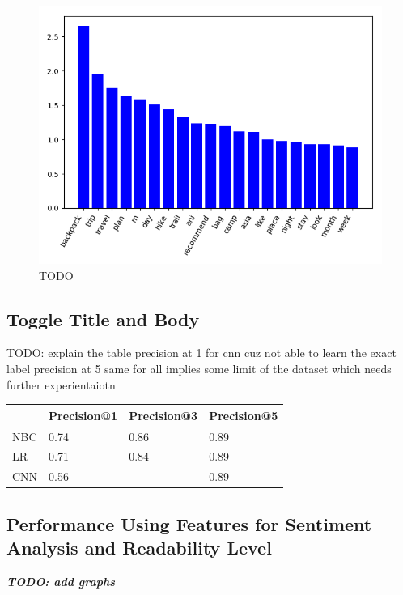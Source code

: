 \documentclass{sig-alternate-05-2015}
\begin{document}
\begin{figure}[H]
\centering
\includegraphics[width=\linewidth]{../coefficients-backpacking-dim-78.png}
\caption{TODO}
\end{figure}

\subsection{Toggle Title and Body}

TODO: explain the table
precision at 1 for cnn cuz not able to learn the exact label
precision at 5 same for all implies some limit of the dataset which needs further experientaiotn

\begin{table}[H]
\begin{tabular}{|l|l|l|l|}
\hline
    & Precision@1 & Precision@3 & Precision@5 \\ \hline
NBC & 0.74        & 0.86        & 0.89        \\ \hline
LR  & 0.71        & 0.84        & 0.89       \\ \hline
CNN & 0.56        & -           & 0.89        \\ \hline
\end{tabular}
\end{table}

\subsection{Performance Using Features for Sentiment Analysis and Readability Level}

\textit{\textbf{TODO: add graphs}}
\end{document}
